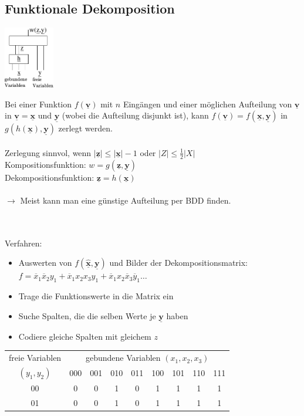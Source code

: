 \documentclass[6pt,a4paper]{scrartcl}
\renewcommand{\vec}[1]{\ensuremath{\underline{\boldsymbol {#1}}}}
\newcommand{\abs}[1]{\ensuremath{\left\vert#1\right\vert}} 							%
\newcommand{\ra}[0]{\ensuremath{\rightarrow}} 									%
\renewcommand{\vec}[1]{\ensuremath{\underline{\boldsymbol {#1}}}}
\begin{document}
\begin{multicols}{3}
\section{Funktionale Dekomposition} %
\label{sub:Funktionale Dekomposition}
\parbox{2.7cm}{ \includegraphics[width = 2.2cm]{./img/ds/decomp.pdf} }
\parbox{6.0cm}{
Bei einer Funktion $f(\vec v)$ mit $n$ Eingängen und einer möglichen Aufteilung von $\vec v$ in $\vec v = \vec x$ und $\vec y$ (wobei die Aufteilung disjunkt ist), kann $f(\vec v) = f(\vec x, \vec y)$ in $g(h(\vec x), \vec y)$ zerlegt werden. \\
\\
Zerlegung sinnvol, wenn $\abs{\vec z} \le \abs{\vec x} -1$ oder $\abs{Z} \le \frac{1}{2} \abs{X}$ \\
Kompositionsfunktion: $w = g(\vec z, \vec y)$ \\
Dekompositionsfunktion: $\vec z = h(\vec x)$ \\
\\
$\ra $ Meist kann man eine günstige Aufteilung per BDD finden. }\\
\\
Verfahren:
\begin{itemize}
	\item Auswerten von $f(\vec{\hat x}, \vec y)$ und Bilder der Dekompositionsmatrix: \\
		$f = \overline x_1\overline x_2 y_1 + \overline x_1  x_2  x_3  y_1 + \overline x_1  x_2 \overline x_3  \overline y_1 \ldots$
	\item Trage die Funktionswerte in die Matrix ein
	\item Suche Spalten, die die selben Werte je $\vec y$ haben
	\item Codiere gleiche Spalten mit gleichem $z$
\end{itemize}
		\begin{tabular}{c | c | c | c | c | c | c | c | c }
			freie Variablen & \multicolumn{8}{c}{gebundene Variablen $(x_1, x_2, x_3)$}  \\
			 $(y_1, y_2)$ & 000 &  001 & 010 & 011 & 100 & 101 & 110 & 111  \\ \midrule
			00	& 0 & 0 & 1 & 0 & 1 & 1 & 1 & 1 \\
			01 & 0 & 0 & 1 & 0 & 1 & 1 & 1 & 1 \\

\end{tabular}
\end{multicols}
\end{document}
